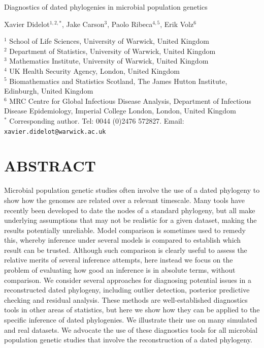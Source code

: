 \documentclass{article}
\begin{document}
{\Large Diagnostics of dated phylogenies in microbial population genetics}


\vspace*{2cm}
Xavier Didelot$^{1,2,*}$, Jake Carson$^{3}$, Paolo Ribeca$^{4,5}$, Erik Volz$^6$

\vspace*{2cm}
$^1$ School of Life Sciences, University of Warwick, United Kingdom\\
$^2$ Department of Statistics, University of Warwick, United Kingdom\\
$^3$ Mathematics Institute, University of Warwick, United Kingdom\\
$^4$ UK Health Security Agency, London, United Kingdom\\
$^5$ Biomathematics and Statistics Scotland, The James Hutton Institute, Edinburgh, United Kingdom\\
$^6$ MRC Centre for Global Infectious Disease Analysis, Department of Infectious Disease Epidemiology, Imperial College London, London, United Kingdom\\
$^*$ Corresponding author. Tel: 0044 (0)2476 572827. Email: \verb+xavier.didelot@warwick.ac.uk+

\newpage
\section*{ABSTRACT}
Microbial population genetic studies often involve the use of a dated phylogeny
to show how the genomes are related over a relevant timescale. 
Many tools have recently been developed to date
the nodes of a standard phylogeny, but all make underlying assumptions that may
not be realistic for a given dataset, making the results potentially unreliable. 
Model comparison is sometimes used to remedy this, whereby inference
under several models is compared to establish which result can be trusted.
Although such comparison is clearly useful to assess the relative merits
of several inference attempts, here instead we focus on the problem
of evaluating how good an inference is in absolute terms, without comparison.
We consider several approaches for diagnosing potential issues
in a reconstructed dated phylogeny, including outlier detection, 
posterior predictive checking and residual analysis. These methods are
well-established diagnostics tools in other areas of statistics, but here
we show how they can be applied to the specific inference of
dated phylogenies. We illustrate their use on many simulated and real datasets.
We advocate the use of these diagnostics tools for all microbial population genetic
studies that involve the reconstruction of a dated phylogeny.
\end{document}
